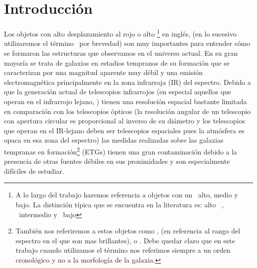 \section{Introducción}\label{sec:1_introduccion}

Los objetos con alto desplazamiento al rojo o alto \rt \footnote{A lo largo del trabajo haremos referencia a objetos con un \rt\ alto, medio y bajo. La distinción típica que se encuentra en la literatura es: alto \rt\ , \rt\ intermedio  y \rt\ bajo } en inglés, (en lo sucesivo utilizaremos el término \rt\ por brevedad) son muy importantes para entender cómo se formaron las estructuras que observamos en el universo actual. En su gran mayoría se trata de galaxias en estadios tempranos de su formación que se caracterizan por una magnitud aparente muy débil y una emisión electromagnética principalmente en la zona infrarroja (IR) del espectro. Debido a que la generación actual de telescopios infrarrojos (en especial aquellos que operan en el infrarrojo lejano, ) tienen una resolución espacial bastante limitada en comparación con los telescopios ópticos (la resolución angular de un telescopio con apertura circular es proporcional al inverso de su diámetro y los telescopios que operan en el \mbox{IR-lejano} deben ser telescopios espaciales pues la atmósfera es opaca en esa zona del espectro) las medidas realizadas sobre las galaxias tempranas en formación\footnote{También nos referiremos a estos objetos como ,  (en referencia al rango del espectro en el que son mas brillantes), o . Debe quedar claro que en este trabajo cuando utilizamos el término  nos referimos siempre a un orden cronológico y no a la morfología de la galaxia.} (\mbox{ETGs}) tienen una gran contaminación debido a la presencia de otras fuentes débiles en sus proximidades y son especialmente difíciles de estudiar. 

